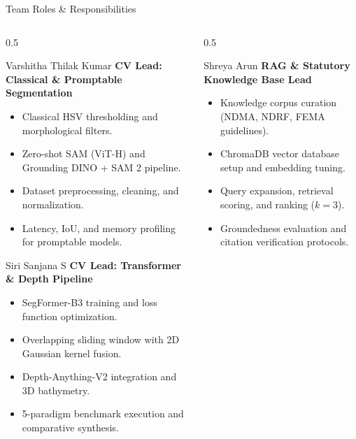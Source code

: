 \documentclass[aspectratio=169, 10pt, professionalfonts]{beamer}
\begin{document}
\begin{frame}{Team Roles \& Responsibilities}
  \begin{columns}[T]
    \begin{column}{0.5\textwidth}
      \begin{block}{Varshitha Thilak Kumar}
        \textbf{CV Lead: Classical \& Promptable Segmentation}
        \begin{itemize}\setlength{\itemsep}{0.3em}\footnotesize
          \item Classical HSV thresholding and morphological filters.
          \item Zero-shot SAM (ViT-H) and Grounding DINO + SAM 2 pipeline.
          \item Dataset preprocessing, cleaning, and normalization.
          \item Latency, IoU, and memory profiling for promptable models.
        \end{itemize}
      \end{block}
      
      \begin{block}{Siri Sanjana S}
        \textbf{CV Lead: Transformer \& Depth Pipeline}
        \begin{itemize}\setlength{\itemsep}{0.3em}\footnotesize
          \item SegFormer-B3 training and loss function optimization.
          \item Overlapping sliding window with 2D Gaussian kernel fusion.
          \item Depth-Anything-V2 integration and 3D bathymetry.
          \item 5-paradigm benchmark execution and comparative synthesis.
        \end{itemize}
      \end{block}
    \end{column}
    
    \begin{column}{0.5\textwidth}
      \begin{block}{Shreya Arun}
        \textbf{RAG \& Statutory Knowledge Base Lead}
        \begin{itemize}\setlength{\itemsep}{0.3em}\footnotesize
          \item Knowledge corpus curation (NDMA, NDRF, FEMA guidelines).
          \item ChromaDB vector database setup and embedding tuning.
          \item Query expansion, retrieval scoring, and ranking ($k=3$).
          \item Groundedness evaluation and citation verification protocols.
        \end{itemize}
      \end{block}
      

\end{column}
\end{columns}
\end{frame}
\end{document}
